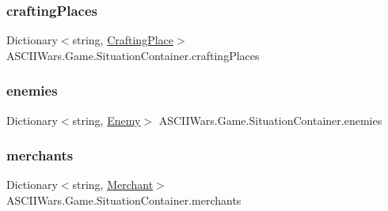 \subsubsection{\texorpdfstring{crafting\+Places}{craftingPlaces}}
{\footnotesize\ttfamily Dictionary$<$string, \hyperlink{class_a_s_c_i_i_wars_1_1_game_1_1_crafting_place}{Crafting\+Place}$>$ A\+S\+C\+I\+I\+Wars.\+Game.\+Situation\+Container.\+crafting\+Places}

\hypertarget{class_a_s_c_i_i_wars_1_1_game_1_1_situation_container_ae83c07e8b05da394daebe44f00e4f4d2}{}\label{class_a_s_c_i_i_wars_1_1_game_1_1_situation_container_ae83c07e8b05da394daebe44f00e4f4d2} 
\subsubsection{\texorpdfstring{enemies}{enemies}}
{\footnotesize\ttfamily Dictionary$<$string, \hyperlink{class_a_s_c_i_i_wars_1_1_game_1_1_enemy}{Enemy}$>$ A\+S\+C\+I\+I\+Wars.\+Game.\+Situation\+Container.\+enemies}

\hypertarget{class_a_s_c_i_i_wars_1_1_game_1_1_situation_container_ad941813542c7012bd5867cc7962f1fee}{}\label{class_a_s_c_i_i_wars_1_1_game_1_1_situation_container_ad941813542c7012bd5867cc7962f1fee} 
\subsubsection{\texorpdfstring{merchants}{merchants}}
{\footnotesize\ttfamily Dictionary$<$string, \hyperlink{class_a_s_c_i_i_wars_1_1_game_1_1_merchant}{Merchant}$>$ A\+S\+C\+I\+I\+Wars.\+Game.\+Situation\+Container.\+merchants}

\hypertarget{class_a_s_c_i_i_wars_1_1_game_1_1_situation_container_a1f019ada2eabbee7c5e51ecf9ce8d75a}{}\label{class_a_s_c_i_i_wars_1_1_game_1_1_situation_container_a1f019ada2eabbee7c5e51ecf9ce8d75a} 

